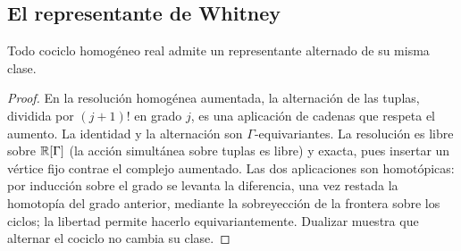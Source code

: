 \subsection{El representante de Whitney}

\begin{lema}
\label{lem:sh-alt}
Todo cociclo homogéneo real admite un representante alternado de su misma clase.
\end{lema}
\begin{proof}
En la resolución homogénea aumentada, la alternación de las tuplas, dividida por $(j+1)!$ en grado $j$, es una aplicación de cadenas que respeta el aumento. La identidad y la alternación son $\Gamma$-equivariantes. La resolución es libre sobre $\mathbb{R}[\Gamma]$ (la acción simultánea sobre tuplas es libre) y exacta, pues insertar un vértice fijo contrae el complejo aumentado. Las dos aplicaciones son homotópicas: por inducción sobre el grado se levanta la diferencia, una vez restada la homotopía del grado anterior, mediante la sobreyección de la frontera sobre los ciclos; la libertad permite hacerlo equivariantemente. Dualizar muestra que alternar el cociclo no cambia su clase.
\end{proof}

